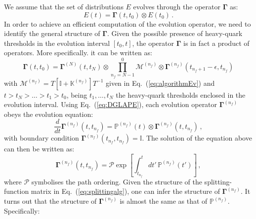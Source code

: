 \documentclass[10pt,a4paper]{article}
\begin{document}
We assume that the set of distributions $E$ evolves through the
operator ${\bm\Gamma}$ as:
\begin{equation}
  E(t) = {\bm\Gamma}(t,t_0)\otimes E(t_0)\,.
\end{equation}
In order to achieve an efficient computation of the evolution
operator, we need to identify the general structure of ${\bm \Gamma}$.
Given the possible presence of heavy-quark thresholds in the evolution
interval $[t_0,t]$, the operator ${\bm\Gamma}$ is in fact a product of
operators. More specifically. it can be written as:
\begin{equation}\label{eq:conbevop}
{\bm\Gamma}(t,t_0)= {\bm\Gamma}^{(N)}(t,t_N) \otimes\prod_{n_f=N-1}^{0} \mathcal{M}^{(n_f)}\otimes{\bm\Gamma}^{(n_f)}(t_{n_f+1}-\epsilon,t_{n_f})
\end{equation}
with
$\mathcal{M}^{(n_f)} =
T\left[\mathbb{I}+\mathbb{K}^{(n_f)}\right]T^{-1}$
given in Eq.~(\ref{eq:algorithmEv}) and $t>t_N>\dots>t_1>t_0$, being
$t_1,\dots,t_N$ the heavy-quark thresholds enclosed in the evolution
interval. Using Eq.~(\ref{eq:DGLAPE}), each evolution operator
${\bm\Gamma}^{(n_f)}$ obeys the evolution equation:
\begin{equation}\label{eq:DGLAPG}
  \frac{d}{dt}{\bm\Gamma}^{(n_f)}(t,t_{n_f}) = \mathbb{P}^{(n_f)}(t)\otimes {\bm\Gamma}^{(n_f)}(t,t_{n_f})\,,
\end{equation}
with boundary condition
${\bm\Gamma}^{(n_f)}(t_{n_f},t_{n_f})=\mathbb{I}$. The solution of the
equation above can then be written as:
\begin{equation}
  {\bm\Gamma}^{(n_f)}(t,t_{n_f}) = \mathcal{P}\exp\left[\int_{t_{n_f}}^tdt'\,\mathbb{P}^{(n_f)}(t')\right]\,,
\end{equation}
where $\mathcal{P}$ symbolises the path ordering. Given the structure
of the splitting-function matrix in Eq.~(\ref{eq:splittingalg}), one
can infer the structure of ${\bm \Gamma}^{(n_f)}$. It turns out that
the structure of ${\bm \Gamma^{(n_f)}}$ is almost the same as that of
$\mathbb{P}^{(n_f)}$. Specifically:
\end{document}
